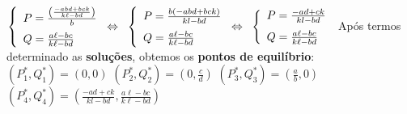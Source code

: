 $
\left\{
\begin{array}{l}
P=\frac{\left(\frac{-abd +bck}{k \ell-bd}\right)}{b}  \medskip  \\
Q=\frac{a \ell-bc}{k \ell-bd}
\end{array}
\right.
\Leftrightarrow\;\;
\left\{
\begin{array}{l}
P=\frac {b(-abd+bck)}{kl-bd}  \medskip  \\
Q=\frac{a \ell-bc}{k \ell-bd}
\end{array}
\right.
\Leftrightarrow\;\;
\left\{
\begin{array}{l}
P=\frac {-ad+ck}{kl-bd}  \medskip  \\
Q=\frac{a \ell-bc}{k \ell-bd}
\end{array}
\right.
$
\bigskip\medskip\newline\noindent Após termos determinado as \textbf{soluções}, obtemos os \textbf{pontos de equilíbrio}:\medskip\newline\noindent
$(P_{1}^{*},Q_{1}^{*})=\left(0,0\right)$\medskip\newline
$(P_{2}^{*},Q_{2}^{*})=\left(0,\frac{c}{d}\right)$\medskip\newline
$(P_{3}^{*},Q_{3}^{*})=\left(\frac{a}{b},0\right)$\medskip\newline
$(P_{4}^{*},Q_{4}^{*})=\left(\frac {-ad+ck}{kl-bd},\frac{a \ell-bc}{k \ell-bd}\right)$

\newpage

